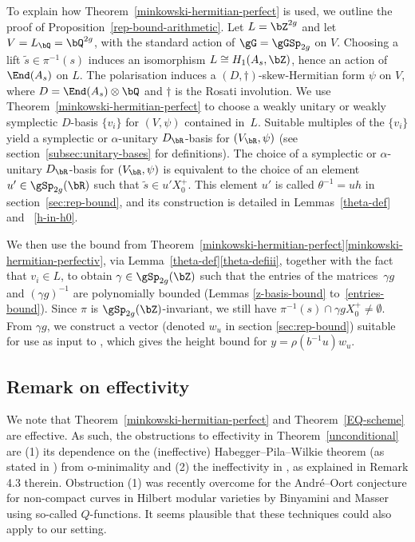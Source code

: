 To explain how Theorem~\ref{minkowski-hermitian-perfect} is used, we outline the proof of Proposition~\ref{rep-bound-arithmetic}. Let $L = \bZ^{2g}$ and let $V = L_\bQ = \bQ^{2g}$, with the standard action of $\gG=\gGSp_{2g}$ on $V$. Choosing a lift $\tilde s \in \pi^{-1}(s)$ induces an isomorphism $L \cong H_1(A_s, \bZ)$, hence an action of $\End(A_s)$ on $L$. The polarisation induces a $(D,\dag)$-skew-Hermitian form $\psi$ on $V$, where $D = \End(A_s) \otimes \bQ$ and $\dag$ is the Rosati involution.
We use Theorem~\ref{minkowski-hermitian-perfect} to choose a weakly unitary or weakly symplectic $D$-basis $\{v_i\}$ for $(V, \psi)$ contained in~$L$.
Suitable multiples of the $\{v_i\}$ yield a symplectic or $\alpha$-unitary $D_\bR$-basis for $(V_\bR, \psi)$ (see section~\ref{subsec:unitary-bases} for definitions).
The choice of a symplectic or $\alpha$-unitary $D_\bR$-basis for $(V_\bR, \psi)$ is equivalent to the choice of an element $u' \in \gSp_{2g}(\bR)$ such that $\tilde s \in u'X_0^+$.
This element $u'$ is called $\theta^{-1}=uh$ in section~\ref{sec:rep-bound}, and its construction is detailed in Lemmas~\ref{theta-def} and~ \ref{h-in-h0}.

We then use the bound from Theorem~\ref{minkowski-hermitian-perfect}\eqref{minkowski-hermitian-perfectiv}, via Lemma~\ref{theta-def}\eqref{theta-defiii}, together with the fact that $v_i \in L$, to obtain $\gamma \in \gSp_{2g}(\bZ)$ such that the entries of the matrices~$\gamma g$ and $(\gamma g)^{-1}$ are polynomially bounded (Lemmas \ref{z-basis-bound} to~\ref{entries-bound}).
Since $\pi$ is $\gSp_{2g}(\bZ)$-invariant, we still have $\pi^{-1}(s) \cap \gamma gX_0^+ \neq \emptyset$.
From $\gamma g$, we construct a vector (denoted $w_u$ in section \ref{sec:rep-bound}) suitable for use as input to \cite[Th.\,1.2]{QRTUI}, which gives the height bound for $y = \rho(b^{-1}u)w_u$.

\subsection{Remark on effectivity}

We note that Theorem~\ref{minkowski-hermitian-perfect} and Theorem~\ref{EQ-scheme} are effective. As such, the obstructions to effectivity in Theorem~\ref{unconditional} are (1) its dependence on the (ineffective) Habegger--Pila--Wilkie theorem (as stated in \cite[Th.\,9.1]{DR18}) from o-minimality and (2) the ineffectivity in \cite{QRTUI}, as explained in Remark 4.3 therein. Obstruction (1) was recently overcome for the André--Oort conjecture for non-compact curves in Hilbert modular varieties by Binyamini and Masser \cite{BM:AO} using so-called $Q$-functions. It seems plausible that these techniques could also apply to our setting.

